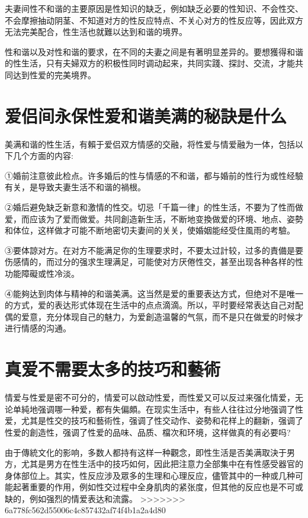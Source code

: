 \documentclass[12pt,UTF8]{ctexbook}
\begin{document}
夫妻间性不和谐的主要原因是性知识的缺乏，例如缺乏必要的性知识、不会性交、不会摩擦抽动阴茎、不知道对方的性反应特点、不关心对方的性反应等，因此双方无法完美配合，性生活也就難以达到和谐的境界。

性和谐以及对性和谐的要求，在不同的夫妻之间是有著明显差异的。要想獲得和谐的性生活，只有夫婦双方的积极性同时调动起来，共同实踐、探討、交流，才能共同达到性爱的完美境界。

\section{爱侣间永保性爱和谐美满的秘訣是什么}

美满和谐的性生活，有賴于爱侣双方情感的交融，将性爱与情爱融为一体，包括以下几个方面的内容:

①婚前注意彼此检点。许多婚后的性与情感的不和谐，都与婚前的性行为或性经驗有关，是导致夫妻生活不和谐的禍根。

②婚后避免缺乏新意和激情的性交。切忌「千篇一律」的性生活，不要为了性而做爱，而应该为了爱而做爱。共同創造新生活，不断地变換做爱的环境、地点、姿勢和体位，这样做才可能不断地密切夫妻间的关关，使婚姻能经受住風雨的考驗。

③要体諒对方。在对方不能满足你的生理要求时，不要太过計较，过多的責備是要伤感情的，而过分的强求生理满足，可能使对方厌倦性交，甚至出现各种各样的性功能障礙或性冷淡。

④能夠达到肉体与精神的和谐美满。这当然是爱的重要表达方式，但绝对不是唯一的方式，爱的表达形式体现在生活中的点点滴滴。所以，平时要经常表达自己对配偶的爱意，充分体现自己的魅力，为爱創造温馨的气氛，而不是只在做爱的时候才进行情感的沟通。

\section{真爱不需要太多的技巧和藝術}

情爱与性爱是密不可分的，情爱可以啟动性爱，而性爱又可以反过来强化情爱，无论单純地强调哪一种爱，都有失偏頗。在现实生活中，有些人往往过分地强调了性爱，尤其是性交的技巧和藝術性，强调了性交动作、姿勢和花样上的翻新，强调了性爱的創造性，强调了性爱的品味、品质、檔次和环境，这样做真的有必要吗?

由于傳統文化的影响，多数人都持有这样一种觀念，即性生活是否美满取決于男方，尤其是男方在性生活中的技巧如何，因此把注意力全部集中在有性感受器官的身体部位上。其实，性反应涉及眾多的生理和心理反应，儘管其中的一种或几种可能起著重要的作用，例如性交过程中全身肌肉的紧张度，但其他的反应也是不可或缺的，例如强烈的情爱表达和流露。
>>>>>>> 6a778fc562d55006c4c857432af74f4b1a2a4d80
\end{document}
